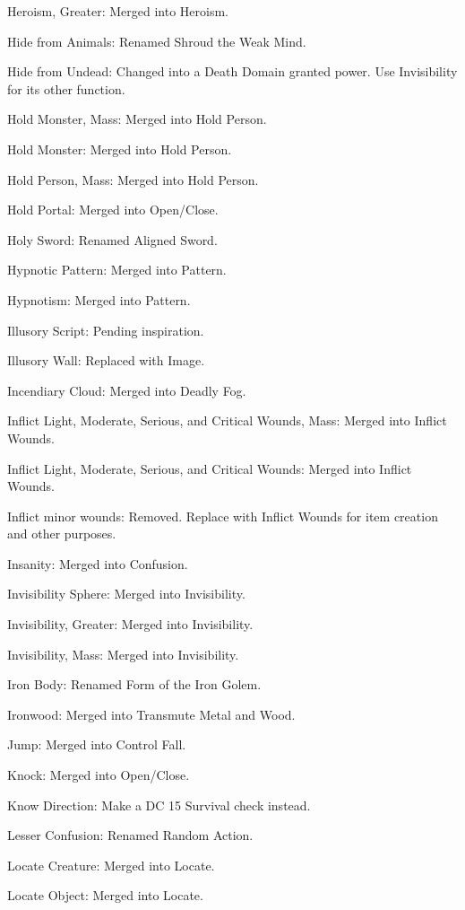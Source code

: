 {\begin{list}{}{\leftmargin=1em}
 \item Heroism, Greater: Merged into Heroism.
 \item Hide from Animals: Renamed Shroud the Weak Mind.
 \item Hide from Undead: Changed into a Death Domain granted power. Use Invisibility for its other function.
 \item Hold Monster, Mass: Merged into Hold Person.
 \item Hold Monster: Merged into Hold Person.
 \item Hold Person, Mass: Merged into Hold Person.
 \item Hold Portal: Merged into Open/Close.
 \item Holy Sword: Renamed Aligned Sword.
 \item Hypnotic Pattern: Merged into Pattern.
 \item Hypnotism: Merged into Pattern.
 \item Illusory Script: Pending inspiration.
 \item Illusory Wall: Replaced with Image. 
 \item Incendiary Cloud: Merged into Deadly Fog.
 \item Inflict Light, Moderate, Serious, and Critical Wounds, Mass: Merged into Inflict Wounds.
 \item Inflict Light, Moderate, Serious, and Critical Wounds: Merged into Inflict Wounds.
 \item Inflict minor wounds: Removed. Replace with Inflict Wounds for item creation and other purposes.
 \item Insanity: Merged into Confusion.
 \item Invisibility Sphere: Merged into Invisibility.
 \item Invisibility, Greater: Merged into Invisibility.
 \item Invisibility, Mass: Merged into Invisibility.
 \item Iron Body: Renamed Form of the Iron Golem.
 \item Ironwood: Merged into Transmute Metal and Wood.
 \item Jump: Merged into Control Fall.
 \item Knock: Merged into Open/Close.
 \item Know Direction: Make a DC 15 Survival check instead.
 \item Lesser Confusion: Renamed Random Action.
 \item Locate Creature: Merged into Locate.
 \item Locate Object: Merged into Locate.

\end{list}}
